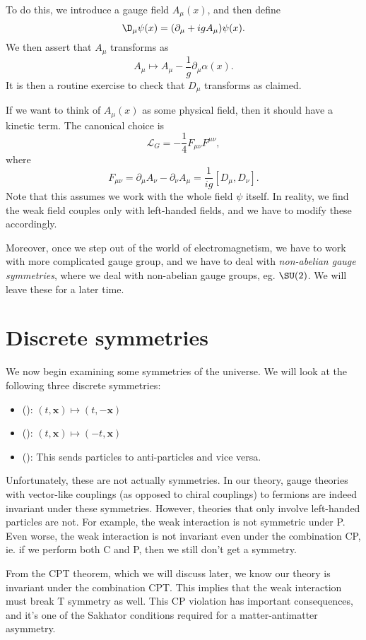 \documentclass[a4paper]{article}
\begin{document}
To do this, we introduce a gauge field $A_\mu(x)$, and then define
\[
  \D_\mu \psi(x) = (\partial_\mu + i g A_\mu) \psi(x).
\]
We then assert that $A_\mu$ transforms as
\[
  A_\mu \mapsto A_\mu - \frac{1}{g} \partial_\mu \alpha(x).
\]
It is then a routine exercise to check that $D_\mu$ transforms as claimed.

If we want to think of $A_\mu(x)$ as some physical field, then it should have a kinetic term. The canonical choice is
\[
  \mathcal{L}_G = -\frac{1}{4} F_{\mu\nu} F^{\mu\nu},
\]
where
\[
  F_{\mu\nu} = \partial_\mu A_\nu - \partial_\nu A_\mu = \frac{1}{ig} [D_\mu, D_\nu].
\]
Note that this assumes we work with the whole field $\psi$ itself. In reality, we find the weak field couples only with left-handed fields, and we have to modify these accordingly.

Moreover, once we step out of the world of electromagnetism, we have to work with more complicated gauge group, and we have to deal with \emph{non-abelian gauge symmetries}, where we deal with non-abelian gauge groups, eg. $\SU(2)$. We will leave these for a later time.

\section{Discrete symmetries}
We now begin examining some symmetries of the universe. We will look at the following three discrete symmetries:
\begin{itemize}
  \item {} (): $(t, \mathbf{x}) \mapsto (t, -\mathbf{x})$
  \item {} (): $(t, \mathbf{x}) \mapsto (-t, \mathbf{x})$
  \item {} (): This sends particles to anti-particles and vice versa.
\end{itemize}
Unfortunately, these are not actually symmetries. In our theory, gauge theories with vector-like couplings (as opposed to chiral couplings) to fermions are indeed invariant under these symmetries. However, theories that only involve left-handed particles are not. For example, the weak interaction is not symmetric under P. Even worse, the weak interaction is not invariant even under the combination CP, ie. if we perform both C and P, then we still don't get a symmetry.

From the CPT theorem, which we will discuss later, we know our theory is invariant under the combination CPT. This implies that the weak interaction must break T symmetry as well. This CP violation has important consequences, and it's one of the Sakhator conditions required for a matter-antimatter asymmetry.
\end{document}
